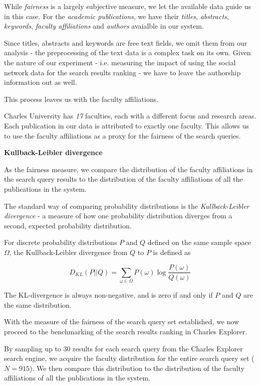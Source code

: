 While \textit{fairness} is a largely subjective measure, we let the available data guide us in this case.
For the \textit{academic publications}, we have their \textit{titles}, \textit{abstracts}, \textit{keywords}, \textit{faculty affiliations} and \textit{authors} avaialble in our system.

Since titles, abstracts and keywords are free text fields, we omit them from our analysis - the preprocessing of the text data is a complex task on its own.
Given the nature of our experiment - i.e. measuring the impact of using the social network data for the search results ranking - we have to leave the authorship information out as well.

This process leaves us with the faculty affiliations.

Charles University has \textit{17} faculties, each with a different focus and research areas.
Each publication in our data is attributed to exactly one faculty.
This allows us to use the faculty affiliations as a proxy for the fairness of the search queries.

\textbf{Kullback-Leibler divergence}

As the fairness measure, we compare the distribution of the faculty affiliations in the search query results 
to the distribution of the faculty affiliations of all the publications in the system.

The standard way of comparing probability distributions is the \textit{Kullback-Leibler divergence} - a measure of how one probability distribution diverges from a second, expected probability distribution.

For discrete probability distributions $P$ and $Q$ defined on the same sample space $\Omega$, the Kullback-Leibler divergence from $Q$ to $P$ is defined as

$$
D_{KL}(P||Q) = \sum_{\omega \in \Omega} P(\omega) \log \frac{P(\omega)}{Q(\omega)}
$$

The KL-divergence is always non-negative, and is zero if and only if $P$ and $Q$ are the same distribution.

With the measure of the fairness of the search query set established, we now proceed to the benchmarking of the search results ranking in Charles Explorer.

By sampling up to 30 results for each search query from the Charles Explorer search engine, we acquire the faculty distribution for the entire search query set ($N = 915$).
We then compare this distribution to the distribution of the faculty affiliations of all the publications in the system.

